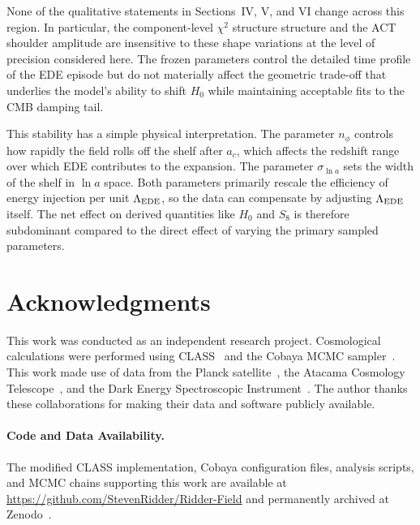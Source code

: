 \documentclass[a4paper,11pt]{article}
\begin{document}
None of the qualitative statements in Sections~IV, V, and VI change across this region. In particular, the component-level $\chi^2$ structure structure and the ACT shoulder amplitude are insensitive to these shape variations at the level of precision considered here. The frozen parameters control the detailed time profile of the EDE episode but do not materially affect the geometric trade-off that underlies the model's ability to shift $H_0$ while maintaining acceptable fits to the CMB damping tail.

This stability has a simple physical interpretation. The parameter $n_\phi$ controls how rapidly the field rolls off the shelf after $a_c$, which affects the redshift range over which EDE contributes to the expansion. The parameter $\sigma_{\ln a}$ sets the width of the shelf in $\ln a$ space. Both parameters primarily rescale the efficiency of energy injection per unit $\Lambda_{\rm EDE}$, so the data can compensate by adjusting $\Lambda_{\rm EDE}$ itself. The net effect on derived quantities like $H_0$ and $S_8$ is therefore subdominant compared to the direct effect of varying the primary sampled parameters.


\section*{Acknowledgments}

This work was conducted as an independent research project. Cosmological calculations were performed using CLASS~\cite{CLASS} and the Cobaya MCMC sampler~\cite{Cobaya}. This work made use of data from the Planck satellite~\cite{Planck2018,Planck2018_params}, the Atacama Cosmology Telescope~\cite{ACT_DR6}, and the Dark Energy Spectroscopic Instrument~\cite{DESI2024}. The author thanks these collaborations for making their data and software publicly available.

\paragraph{Code and Data Availability.}
The modified CLASS implementation, Cobaya configuration files, analysis scripts, and MCMC chains supporting this work are available at \url{https://github.com/StevenRidder/Ridder-Field} and permanently archived at Zenodo~\cite{zenodo_data}.
\end{document}
